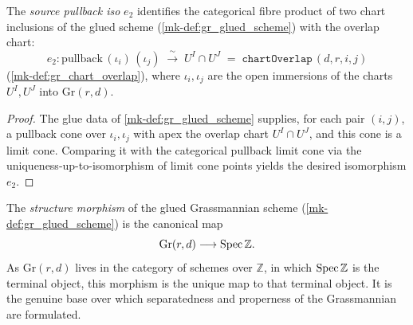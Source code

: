 \begin{definition}\label{mk-def:gr_pullbackιIso}
  \leanok

  The \emph{source pullback iso} \(e_2\) identifies the categorical fibre product
  of two chart inclusions of the glued scheme (\ref{mk-def:gr_glued_scheme}) with
  the overlap chart:
  \[
    e_2 : \mathrm{pullback}\,(\iota_i)\,(\iota_j) \;\xrightarrow{\;\sim\;}\;
    U^I \cap U^J \;=\; \texttt{chartOverlap}\,(d,r,i,j)
  \]
  (\ref{mk-def:gr_chart_overlap}), where \(\iota_i, \iota_j\) are the open
  immersions of the charts \(U^I, U^J\) into \(\mathrm{Gr}(r,d)\).
\end{definition}
\begin{proof}
  \leanok
  The glue data of \ref{mk-def:gr_glued_scheme} supplies, for each pair \((i,j)\), a
  pullback cone over \(\iota_i, \iota_j\) with apex the overlap chart \(U^I \cap
  U^J\), and this cone is a limit cone. Comparing it with the categorical
  pullback limit cone via the uniqueness-up-to-isomorphism of limit cone points
  yields the desired isomorphism \(e_2\).
\end{proof}

\begin{definition}\label{mk-def:gr_to_specZ}
  \leanok

  The \emph{structure morphism} of the glued Grassmannian scheme
  (\ref{mk-def:gr_glued_scheme}) is the canonical map
  \[
    \mathrm{Gr}(r,d) \longrightarrow \operatorname{Spec} \mathbb{Z} .
  \]
  As \(\mathrm{Gr}(r,d)\) lives in the category of schemes over \(\mathbb{Z}\), in
  which \(\operatorname{Spec} \mathbb{Z}\) is the terminal object, this morphism is the unique
  map to that terminal object. It is the genuine base over which separatedness and
  properness of the Grassmannian are formulated.
\end{definition}


